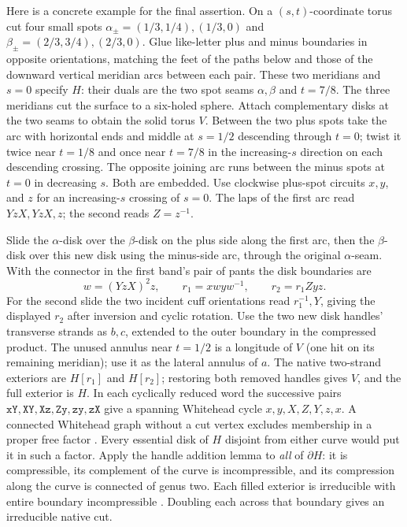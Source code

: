 \documentclass[11pt,letterpaper]{article}
\numberwithin{equation}{section}
\theoremstyle{remark}
\begin{document}
Here is a concrete example for the final assertion. On a
\((s,t)\)-coordinate torus cut four small spots
\(\alpha_\pm=(1/3,1/4),(1/3,0)\) and
\(\beta_\pm=(2/3,3/4),(2/3,0)\). Glue like-letter plus and minus
boundaries in opposite orientations, matching the feet of the paths
below and those of the downward vertical meridian arcs between each
pair. These two meridians and \(s=0\) specify \(H\): their duals are
the two spot seams \(\alpha,\beta\) and \(t=7/8\). The three
meridians cut the surface to a six-holed sphere. Attach complementary
disks at the two seams to obtain the solid torus \(V\). Between the
two plus spots take the arc with horizontal ends and middle at \(s=1/2\)
descending through \(t=0\); twist it twice near \(t=1/8\) and once
near \(t=7/8\) in the increasing-\(s\) direction on each descending
crossing. The opposite joining arc runs between the minus spots at
\(t=0\) in decreasing \(s\). Both are embedded. Use clockwise
plus-spot circuits \(x,y\), and \(z\) for an increasing-\(s\)
crossing of \(s=0\). The laps of the first arc read \(YzX,YzX,z\);
the second reads \(Z=z^{-1}\).

Slide the \(\alpha\)-disk over the \(\beta\)-disk on the plus side
along the first arc, then the \(\beta\)-disk over this new disk
using the minus-side arc, through the original \(\alpha\)-seam.
With the connector in the first band's pair of pants the disk
boundaries are
\[
 w=(YzX)^2z,\qquad r_1=x w y w^{-1},\qquad r_2=r_1 Z y z .
\]
For the second slide the two incident cuff orientations read
\(r_1^{-1},Y\), giving the displayed \(r_2\) after inversion and
cyclic rotation. Use the two new disk handles' transverse strands as
\(b,c\), extended to the outer boundary in the compressed product.
The unused annulus near \(t=1/2\) is a longitude of \(V\) (one hit on
its remaining meridian); use it as the lateral annulus of \(a\).
The native two-strand exteriors are \(H[r_1]\) and \(H[r_2]\);
restoring both removed handles gives \(V\), and the full exterior
is \(H\). In each cyclically reduced word the successive pairs
\(\mathtt{xY,XY,Xz,Zy,zy,zX}\) give a spanning Whitehead cycle
\(x,y,X,Z,Y,z,x\). A connected Whitehead graph without a cut
vertex excludes membership in a proper free factor
\cite[Proposition 6.4]{Krishna2023Vertex}. Every essential disk of
\(H\) disjoint from either curve would put it in such a factor.
Apply the handle addition lemma to \emph{all} of \(\partial H\):
it is compressible, its complement of the curve is incompressible,
and its compression along the curve is connected of genus two.
Each filled exterior is irreducible with entire boundary
incompressible \cite[Lemma 2.1.1]{CGLS1987DehnSurgery}. Doubling each
across that boundary gives an irreducible native cut.
\end{document}
